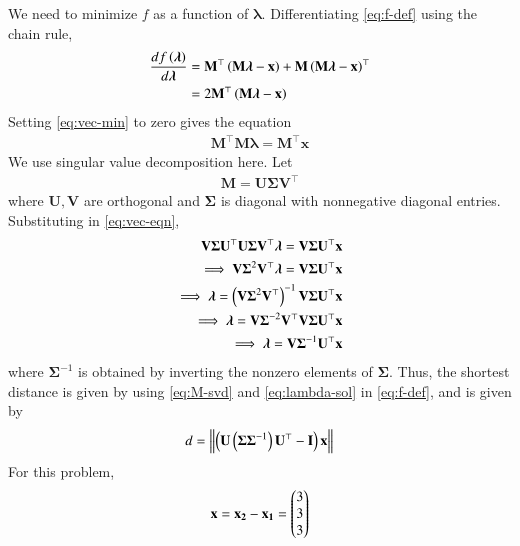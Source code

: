 \documentclass[journal,12pt,twocolumn]{IEEEtran}
\renewcommand{\vec}[1]{\boldsymbol{\mathbf{#1}}}
\begin{document}
\begin{enumerate}
    We need to minimize $f$ as a function of $\vec{\lambda}$.
    Differentiating \eqref{eq:f-def} using the chain rule,
    \begin{align}
        \frac{df\brak{\vec{\lambda}}}{d\vec{\lambda}} &= \vec{M}^\top\brak{\vec{M\lambda}-\vec{x}}+\vec{M}\brak{\vec{M\lambda}-\vec{x}}^\top \\
                                                      &= 2\vec{M}^\top\brak{\vec{M\lambda}-\vec{x}}
        \label{eq:vec-min}
    \end{align}
    Setting \eqref{eq:vec-min} to zero gives the equation
    \begin{align}
        \vec{M}^\top\vec{M\lambda} = \vec{M}^\top\vec{x}
        \label{eq:vec-eqn}
    \end{align}
    We use singular value decomposition here. Let
    \begin{align}
        \vec{M} = \vec{U\Sigma V}^\top
        \label{eq:M-svd}
    \end{align}
    where $\vec{U}, \vec{V}$ are orthogonal and $\vec{\Sigma}$ is diagonal with
    nonnegative diagonal entries. Substituting in \eqref{eq:vec-eqn},
    \begin{align}
        \vec{V\Sigma U}^\top\vec{U\Sigma V}^\top\vec{\lambda} = \vec{V\Sigma U}^\top\vec{x} \\
        \implies \vec{V\Sigma}^2\vec{V}^\top\vec{\lambda} = \vec{V\Sigma U}^\top\vec{x} \\
        \implies \vec{\lambda} = \brak{\vec{V\Sigma}^2\vec{V}^\top}^{-1}\vec{V\Sigma U}^\top\vec{x} \\
        \implies \vec{\lambda} = \vec{V\Sigma}^{-2}\vec{V}^\top\vec{V\Sigma U}^\top\vec{x} \\
        \implies \vec{\lambda} = \vec{V\Sigma}^{-1}\vec{U}^\top\vec{x} \label{eq:lambda-sol}
    \end{align}
    where $\vec{\Sigma}^{-1}$ is obtained by inverting the nonzero elements of
    $\vec{\Sigma}$. Thus, the shortest distance is given by using \eqref{eq:M-svd}
    and \eqref{eq:lambda-sol} in \eqref{eq:f-def}, and is given by
    \begin{align}
        d = \norm{\brak{\vec{U}\brak{\vec{\Sigma\Sigma}^{-1}}\vec{U}^\top-\vec{I}}\vec{x}}
        \label{eq:min-sol}
    \end{align}
    For this problem,
    \begin{align}
        \vec{x} = \vec{x_2} - \vec{x_1} = \myvec{3\\3\\3} \\

\end{align}
\end{enumerate}
\end{document}
